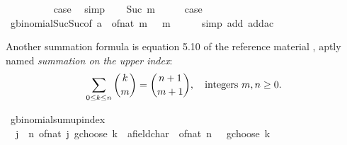 \begin{isabellebody}
\ \ \isamarkupfalse%
\ {}\isanewline
\ \ \isamarkupfalse%
\ \isamarkupfalse%
\ {\isacharquery}{\kern0pt}case\ \isamarkupfalse%
\ simp\isanewline
{}\isamarkupfalse%
\isanewline
\ \ \isamarkupfalse%
\ {\isacharparenleft}{\kern0pt}Suc\ m{\isacharparenright}{\kern0pt}\isanewline
\ \ \isamarkupfalse%
\ \isamarkupfalse%
\ {\isacharquery}{\kern0pt}case\isanewline
\ \ \ \ \isamarkupfalse%
\ gbinomial{\isacharunderscore}{\kern0pt}Suc{\isacharunderscore}{\kern0pt}Suc{\isacharbrackleft}{\kern0pt}of\ {\isachardoublequoteopen}{\isacharparenleft}{\kern0pt}a\ {\isacharplus}{\kern0pt}\ of{\isacharunderscore}{\kern0pt}nat\ m\ {\isacharplus}{\kern0pt}\ {}{\isacharparenright}{\kern0pt}{\isachardoublequoteclose}\ m{\isacharbrackright}{\kern0pt}\isanewline
\ \ \ \ \isamarkupfalse%
\ {\isacharparenleft}{\kern0pt}simp\ add{\isacharcolon}{\kern0pt}\ add{\isacharunderscore}{\kern0pt}ac{\isacharparenright}{\kern0pt}\isanewline
{}\isamarkupfalse%
%
\endisatagproof
{\isafoldproof}%
%
\isadelimproof
%
\endisadelimproof
%
\isadelimdocument
%
\endisadelimdocument
%
\isatagdocument
%
\isamarkuptrue%
%
\endisatagdocument
{\isafolddocument}%
%
\isadelimdocument
%
\endisadelimdocument
%
\begin{isamarkuptext}%
Another summation formula is equation 5.10 of the reference material \cite[p.~160]{GKP_CM},
  aptly named \emph{summation on the upper index}:\[\sum_{0 \leq k \leq n} {k \choose m} =
  {n + 1 \choose m + 1}, \quad \textnormal{integers } m, n \geq 0.\]%
\end{isamarkuptext}\isamarkuptrue%
\isamarkupfalse%
\ gbinomial{\isacharunderscore}{\kern0pt}sum{\isacharunderscore}{\kern0pt}up{\isacharunderscore}{\kern0pt}index{\isacharcolon}{\kern0pt}\isanewline
\ \ {\isachardoublequoteopen}{\isacharparenleft}{\kern0pt}{\isasymSum}j\ {\isacharequal}{\kern0pt}\ {}{\isachardot}{\kern0pt}{\isachardot}{\kern0pt}n{\isachardot}{\kern0pt}\ {\isacharparenleft}{\kern0pt}of{\isacharunderscore}{\kern0pt}nat\ j\ gchoose\ k{\isacharparenright}{\kern0pt}\ {\isacharcolon}{\kern0pt}{\isacharcolon}{\kern0pt}\ {\isacharprime}{\kern0pt}a{\isacharcolon}{\kern0pt}{\isacharcolon}{\kern0pt}field{\isacharunderscore}{\kern0pt}char{\isacharunderscore}{\kern0pt}{}{\isacharparenright}{\kern0pt}\ {\isacharequal}{\kern0pt}\ {\isacharparenleft}{\kern0pt}of{\isacharunderscore}{\kern0pt}nat\ n\ {\isacharplus}{\kern0pt}\ {}{\isacharparenright}{\kern0pt}\ gchoose\ {\isacharparenleft}{\kern0pt}k\ {\isacharplus}{\kern0pt}\ {}{\isacharparenright}{\kern0pt}{\isachardoublequoteclose}\isanewline

\end{isabellebody}
